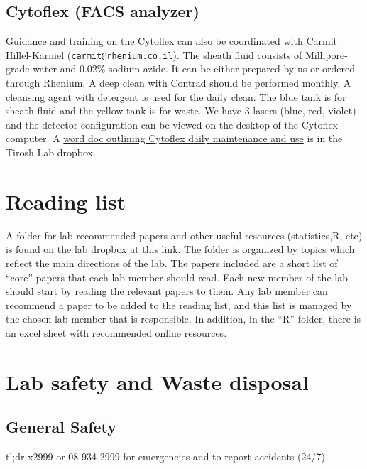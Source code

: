 \documentclass[]{book}
\begin{document}
\section{Cytoflex (FACS analyzer)}\label{cytoflex-facs-analyzer}

Guidance and training on the Cytoflex can also be coordinated with
Carmit Hillel-Karniel
(\href{mailto:carmit@rhenium.co.il}{\nolinkurl{carmit@rhenium.co.il}}).
The sheath fluid consists of Millipore-grade water and 0.02\% sodium
azide. It can be either prepared by us or ordered through Rhenium. A
deep clean with Contrad should be performed monthly. A cleansing agent
with detergent is used for the daily clean. The blue tank is for sheath
fluid and the yellow tank is for waste. We have 3 lasers (blue, red,
violet) and the detector configuration can be viewed on the desktop of
the Cytoflex computer. A
\href{https://www.dropbox.com/s/ckvy0vshi45e95r/LSR\%20II\%20Quick\%20Reference.docx?dl=0}{word
doc outlining Cytoflex daily maintenance and use} is in the Tirosh Lab
dropbox.

\chapter{Reading list}\label{readingList}

A folder for lab recommended papers and other useful resources
(statistics,R, etc) is found on the lab dropbox at
\href{https://www.dropbox.com/sh/52ybes4a40ypn0q/AAAL2FlVKqRJw-Z4ScuWTW7Ra?dl=0}{this
link}. The folder is organized by topics which reflect the main
directions of the lab. The papers included are a short list of ``core''
papers that each lab member should read. Each new member of the lab
should start by reading the relevant papers to them. Any lab member can
recommend a paper to be added to the reading list, and this list is
managed by the chosen lab member that is responsible. In addition, in
the ``R'' folder, there is an excel sheet with recommended online
resources.

\chapter{Lab safety and Waste disposal}\label{safety}

\section{General Safety}\label{general-safety}

tl;dr x2999 or 08-934-2999 for emergencies and to report accidents
(24/7)
\end{document}
